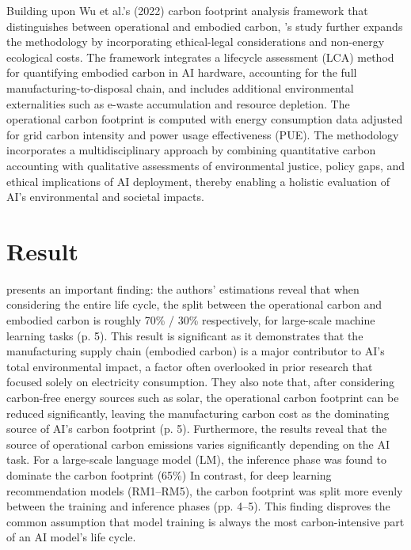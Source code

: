 \documentclass[a4paper, 12pt]{article}
\begin{document}
\hspace{24pt}Building upon Wu et al.'s (2022) carbon footprint analysis framework that distinguishes between operational and embodied carbon, \citet{Zhuk2023}'s study further expands the methodology by incorporating ethical-legal considerations and non-energy ecological costs. The framework integrates a lifecycle assessment (LCA) method for quantifying embodied carbon in AI hardware, accounting for the full manufacturing-to-disposal chain, and includes additional environmental externalities such as e-waste accumulation and resource depletion. The operational carbon footprint is computed with energy consumption data adjusted for grid carbon intensity and power usage effectiveness (PUE). The methodology incorporates a multidisciplinary approach by combining quantitative carbon accounting with qualitative assessments of environmental justice, policy gaps, and ethical implications of AI deployment, thereby enabling a holistic evaluation of AI's environmental and societal impacts.

\section{Result}
\hspace{24pt}\citet{Wu2022} presents an important finding: the authors' estimations reveal that when considering the entire life cycle, the split between the operational carbon and embodied carbon is roughly 70\% / 30\% respectively, for large-scale machine learning tasks (p. 5). This result is significant as it demonstrates that the manufacturing supply chain (embodied carbon) is a major contributor to AI's total environmental impact, a factor often overlooked in prior research that focused solely on electricity consumption. They also note that, after considering carbon-free energy sources such as solar, the operational carbon footprint can be reduced significantly, leaving the manufacturing carbon cost as the dominating source of AI's carbon footprint (p. 5). Furthermore, the results reveal that the source of operational carbon emissions varies significantly depending on the AI task. For a large-scale language model (LM), the inference phase was found to dominate the carbon footprint (65\%) In contrast, for deep learning recommendation models (RM1–RM5), the carbon footprint was split more evenly between the training and inference phases (pp. 4–5). This finding disproves the common assumption that model training is always the most carbon-intensive part of an AI model's life cycle.
\end{document}
